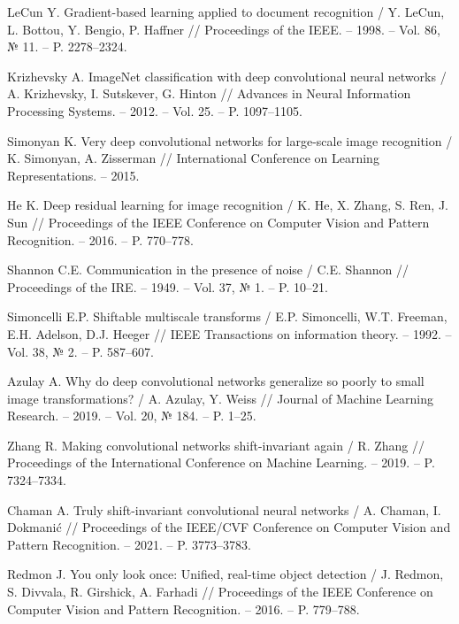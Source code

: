 \begin{thebibliography}{99}

LeCun Y. Gradient-based learning applied to document recognition / Y. LeCun, L. Bottou, Y. Bengio, P. Haffner // Proceedings of the IEEE. -- 1998. -- Vol. 86, № 11. -- P. 2278--2324.

Krizhevsky A. ImageNet classification with deep convolutional neural networks / A. Krizhevsky, I. Sutskever, G. Hinton // Advances in Neural Information Processing Systems. -- 2012. -- Vol. 25. -- P. 1097--1105.

Simonyan K. Very deep convolutional networks for large-scale image recognition / K. Simonyan, A. Zisserman // International Conference on Learning Representations. -- 2015.

He K. Deep residual learning for image recognition / K. He, X. Zhang, S. Ren, J. Sun // Proceedings of the IEEE Conference on Computer Vision and Pattern Recognition. -- 2016. -- P. 770--778.

Shannon C.E. Communication in the presence of noise / C.E. Shannon // Proceedings of the IRE. -- 1949. -- Vol. 37, № 1. -- P. 10--21.

Simoncelli E.P. Shiftable multiscale transforms / E.P. Simoncelli, W.T. Freeman, E.H. Adelson, D.J. Heeger // IEEE Transactions on information theory. -- 1992. -- Vol. 38, № 2. -- P. 587--607.

Azulay A. Why do deep convolutional networks generalize so poorly to small image transformations? / A. Azulay, Y. Weiss // Journal of Machine Learning Research. -- 2019. -- Vol. 20, № 184. -- P. 1--25.

Zhang R. Making convolutional networks shift-invariant again / R. Zhang // Proceedings of the International Conference on Machine Learning. -- 2019. -- P. 7324--7334.

Chaman A. Truly shift-invariant convolutional neural networks / A. Chaman, I. Dokmanić // Proceedings of the IEEE/CVF Conference on Computer Vision and Pattern Recognition. -- 2021. -- P. 3773--3783.

Redmon J. You only look once: Unified, real-time object detection / J. Redmon, S. Divvala, R. Girshick, A. Farhadi // Proceedings of the IEEE Conference on Computer Vision and Pattern Recognition. -- 2016. -- P. 779--788.


\end{thebibliography}
